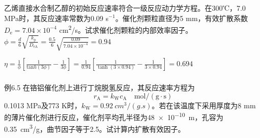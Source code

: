 \documentclass[dvipsnames, svgnames, x11names]{beamer}
\begin{document}
\begin{frame}[t]
    \frametitle{}
    \begin{example}
        乙烯直接水合制乙醇的初始反应速率符合一级反应动力学方程。在300℃，7.0 MPa时，其反应速率常数为0.09 s$^{-1}$。催化剂颗粒直径为5 mm，有效扩散系数$D_\mathrm{e} = 7.04\times 10^{-4}$ \si{cm^2/s}。试求催化剂颗粒的内部效率因子。
        \tcblower
        \pause
        $\phi = \frac{d}{6}\sqrt{\frac{k_\mathrm{p}}{D_\mathrm{eA}}} = \frac{0.5}{6}\sqrt{\frac{0.09}{7.04\times 10^{-4}}} = 0.94$

$\eta = \frac{1}{\phi}[\frac{1}{\mathrm{tan}h (3\phi)}-\frac{1}{3\phi}] = \frac{1}{0.94}[\frac{1}{\tanh (3\times 0.94)}-\frac{1}{3\times 0.94}] = 0.694$
    \end{example}
\end{frame}


\begin{frame}[t]
    \frametitle{}

    \begin{block}{例6.5}
        在铬铝催化剂上进行丁烷脱氢反应，其反应速率方程为
        \[
            r_{\mathrm{A}} =k_{\mathrm{W}} c_{\mathrm{A}} \quad \mathrm{mol} /(\mathrm{g} \cdot \mathrm{s})
        \]
        0.1013 MPa及773 K时，$k_\mathrm{W} = \SI{0.92}{cm^3/(g.s)}$。若在该温度下采用厚度为8 mm的薄片催化剂进行反应，催化剂平均孔半径为\SI{48e-10}{m}，孔容为\SI{0.35}{cm^3/g}，曲节因子等于2.5。试计算内扩散有效因子。
    \tcblower
    \end{block}
\end{frame}
\end{document}

